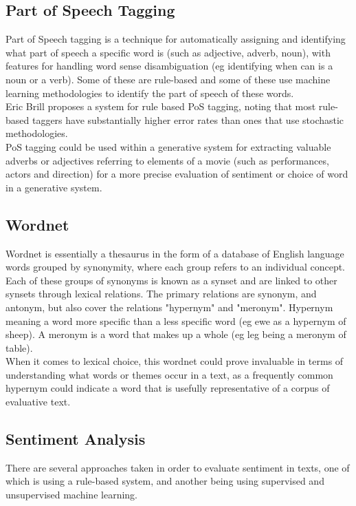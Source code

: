 \subsection{Part of Speech Tagging}
Part of Speech tagging is a technique for automatically assigning and identifying what part of speech a specific word is (such as adjective, adverb, noun), with features for handling word sense disambiguation (eg identifying when can is a noun or a verb). Some of these are rule-based and some of these use machine learning methodologies to identify the part of speech of these words.\\
Eric Brill proposes a system for rule based PoS tagging, noting that most rule-based taggers have substantially higher error rates than ones that use stochastic methodologies.\\
PoS tagging could be used within a generative system for extracting valuable adverbs or adjectives referring to elements of a movie (such as performances, actors and direction) for a more precise evaluation of sentiment or choice of word in a generative system.
\subsection{Wordnet}

Wordnet is essentially a thesaurus in the form of a database of English language words grouped by synonymity, where each group refers to an individual concept. Each of these groups of synonyms is known as a synset and are linked to other synsets through lexical relations.
The primary relations are synonym, and antonym, but also cover the relations "hypernym" and "meronym". Hypernym meaning a word more specific than a less specific word (eg ewe as a hypernym of sheep). A meronym is a word that makes up a whole (eg leg being a meronym of table). \\

When it comes to lexical choice, this wordnet could prove invaluable in terms of understanding what words or themes occur in a text, as a frequently common hypernym could indicate a word that is usefully representative of a corpus of evaluative text.


\subsection{Sentiment Analysis}
There are several approaches taken in order to evaluate sentiment in texts, one of which is using a rule-based system, and another being using supervised and unsupervised machine learning.\\

